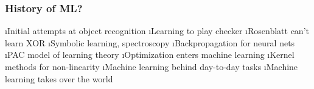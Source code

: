 \documentclass{beamer}
\begin{document}
\begin{frame}
\frametitle{History of ML?}

\bei
\i Initial attempts at object recognition 
\i Learning to play checker 
\i Rosenblatt can't learn XOR 
\i Symbolic learning, spectroscopy 
\i Backpropagation for neural nets 
\i PAC model of learning theory 
\i Optimization enters machine learning 
\i Kernel methods for non-linearity 
\i Machine learning behind day-to-day tasks 
\i Machine learning takes over the world 
\eni
\end{frame}
\end{document}
